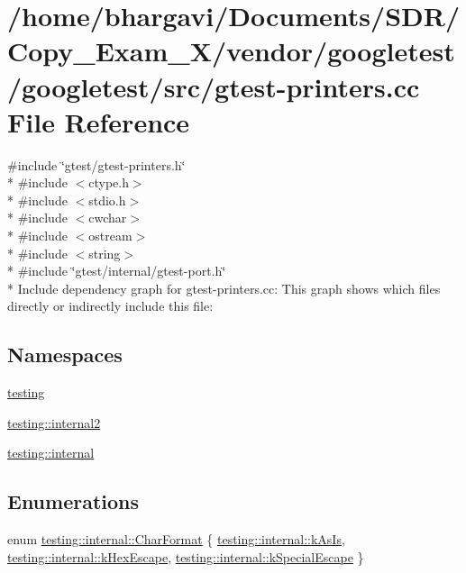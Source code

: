 \hypertarget{gtest-printers_8cc}{}\section{/home/bhargavi/\+Documents/\+S\+D\+R/\+Copy\+\_\+\+Exam\+\_\+X/vendor/googletest/googletest/src/gtest-\/printers.cc File Reference}
\label{gtest-printers_8cc}
{\ttfamily \#include \char`\"{}gtest/gtest-\/printers.\+h\char`\"{}}\\*
{\ttfamily \#include $<$ctype.\+h$>$}\\*
{\ttfamily \#include $<$stdio.\+h$>$}\\*
{\ttfamily \#include $<$cwchar$>$}\\*
{\ttfamily \#include $<$ostream$>$}\\*
{\ttfamily \#include $<$string$>$}\\*
{\ttfamily \#include \char`\"{}gtest/internal/gtest-\/port.\+h\char`\"{}}\\*
Include dependency graph for gtest-\/printers.cc\+:
This graph shows which files directly or indirectly include this file\+:
\subsection*{Namespaces}
\begin{DoxyCompactItemize}
\item 
 \hyperlink{namespacetesting}{testing}
\item 
 \hyperlink{namespacetesting_1_1internal2}{testing\+::internal2}
\item 
 \hyperlink{namespacetesting_1_1internal}{testing\+::internal}
\end{DoxyCompactItemize}
\subsection*{Enumerations}
\begin{DoxyCompactItemize}
\item 
enum \hyperlink{namespacetesting_1_1internal_ae2ef98247c76a50cdc80ceb4a6c81793}{testing\+::internal\+::\+Char\+Format} \{ \hyperlink{namespacetesting_1_1internal_ae2ef98247c76a50cdc80ceb4a6c81793af7038866be92e9978360b831e376ffaa}{testing\+::internal\+::k\+As\+Is}, 
\hyperlink{namespacetesting_1_1internal_ae2ef98247c76a50cdc80ceb4a6c81793aebfa5293302338a8e8678744c103f113}{testing\+::internal\+::k\+Hex\+Escape}, 
\hyperlink{namespacetesting_1_1internal_ae2ef98247c76a50cdc80ceb4a6c81793ae1211108e9f35f891d9951da64794d03}{testing\+::internal\+::k\+Special\+Escape}
 \}
\end{DoxyCompactItemize}
